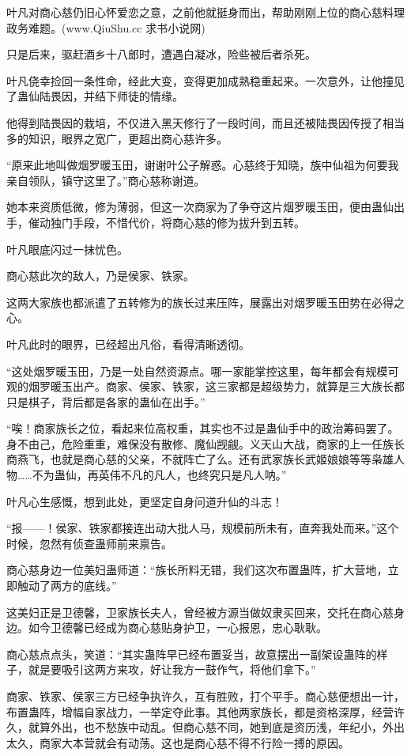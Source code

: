 \begin{this_body}
叶凡对商心慈仍旧心怀爱恋之意，之前他就挺身而出，帮助刚刚上位的商心慈料理政务难题。(www.QiuShu.cc 求书小说网)

只是后来，驱赶酒乡十八郎时，遭遇白凝冰，险些被后者杀死。

叶凡侥幸捡回一条性命，经此大变，变得更加成熟稳重起来。一次意外，让他撞见了蛊仙陆畏因，并结下师徒的情缘。

他得到陆畏因的栽培，不仅进入黑天修行了一段时间，而且还被陆畏因传授了相当多的知识，眼界之宽广，更超出商心慈许多。

“原来此地叫做烟罗暖玉田，谢谢叶公子解惑。心慈终于知晓，族中仙祖为何要我亲自领队，镇守这里了。”商心慈称谢道。

她本来资质低微，修为薄弱，但这一次商家为了争夺这片烟罗暖玉田，便由蛊仙出手，催动独门手段，不惜代价，将商心慈的修为拔升到五转。

叶凡眼底闪过一抹忧色。

商心慈此次的敌人，乃是侯家、铁家。

这两大家族也都派遣了五转修为的族长过来压阵，展露出对烟罗暖玉田势在必得之心。

叶凡此时的眼界，已经超出凡俗，看得清晰透彻。

“这处烟罗暖玉田，乃是一处自然资源点。哪一家能掌控这里，每年都会有规模可观的烟罗暖玉出产。商家、侯家、铁家，这三家都是超级势力，就算是三大族长都只是棋子，背后都是各家的蛊仙在出手。”

“唉！商家族长之位，看起来位高权重，其实也不过是蛊仙手中的政治筹码罢了。身不由己，危险重重，难保没有散修、魔仙觊觎。义天山大战，商家的上一任族长商燕飞，也就是商心慈的父亲，不就阵亡了么。还有武家族长武姬娘娘等等枭雄人物……不为蛊仙，再英伟不凡的凡人，也终究只是凡人呐。”

叶凡心生感慨，想到此处，更坚定自身问道升仙的斗志！

“报——！侯家、铁家都接连出动大批人马，规模前所未有，直奔我处而来。”这个时候，忽然有侦查蛊师前来禀告。

商心慈身边一位美妇蛊师道：“族长所料无错，我们这次布置蛊阵，扩大营地，立即触动了两方的底线。”

这美妇正是卫德馨，卫家族长夫人，曾经被方源当做奴隶买回来，交托在商心慈身边。如今卫德馨已经成为商心慈贴身护卫，一心报恩，忠心耿耿。

商心慈点点头，笑道：“其实蛊阵早已经布置妥当，故意摆出一副架设蛊阵的样子，就是要吸引这两方来攻，好让我方一鼓作气，将他们拿下。”

商家、铁家、侯家三方已经争执许久，互有胜败，打个平手。商心慈便想出一计，布置蛊阵，增幅自家战力，一举定夺此事。其他两家族长，都是资格深厚，经营许久，就算外出，也不愁族中动乱。但商心慈不同，她到底是资历浅，年纪小，外出太久，商家大本营就会有动荡。这也是商心慈不得不行险一搏的原因。


\end{this_body}
